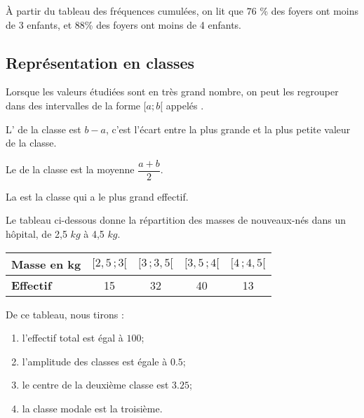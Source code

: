  À partir du tableau des fréquences cumulées, on lit que \( 76\) \% des foyers ont moins de 3 enfants, et \( 88\)\% des foyers ont moins de 4 enfants.

\subsection{Représentation en classes}

Lorsque les valeurs étudiées sont en très grand nombre, on peut les
regrouper dans des intervalles de la forme $[a;b[$ appelés
    . 

    L' de la classe est $b-a$, c'est l'écart entre la plus
grande et la plus petite valeur de la classe.

Le  de la classe est la moyenne $\dfrac{a+b}2$.

La  est la classe qui a le plus grand effectif. 

\medskip

\begin{example}
Le tableau ci-dessous donne la répartition des masses de nouveaux-nés dans un hôpital, de 2,5 $kg$ à 4,5 $kg$.


\begin{center}
  \begin{tabular}[h]{|l|c|c|c|c|}
    \hline
    \textbf{Masse en kg} & $[2,\!5\,;3[$ & $[3\,;3,\!5[$ & $[3,\!5\,;4[$ &
    $[4\,;4,\!5[$ \\
    \hline
    \textbf{Effectif} & 15 & 32 & 40 & 13 \\
    \hline
  \end{tabular}
    
\end{center}
  
De ce tableau, nous tirons :
\begin{enumerate}
    \item
  l'effectif total est égal à \( 100\);
  \item
  l'amplitude des classes est égale à \( 0.5\);
  \item
  le centre de la deuxième classe est \( 3.25\);
  \item
  la classe modale est la troisième.
\end{enumerate}


    
\end{example}





